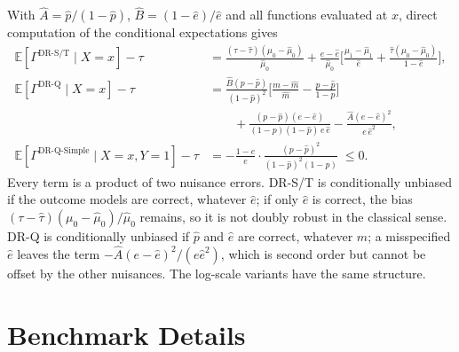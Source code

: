 \documentclass{article}
\newcommand{\E}{\mathbb{E}}
\begin{document}
With $\hat A=\hat p/(1-\hat p)$, $\hat B=(1-\hat e)/\hat e$ and all
functions evaluated at $x$, direct computation of the conditional
expectations gives
\begin{align}
\E[\Gamma^{\text{DR-S/T}}\mid X{=}x]-\tau
 &=\frac{(\tau-\hat\tau)(\mu_0-\hat\mu_0)}{\hat\mu_0}
  +\frac{e-\hat e}{\hat\mu_0}\Big[\frac{\mu_1-\hat\mu_1}{\hat e}+\frac{\hat\tau(\mu_0-\hat\mu_0)}{1-\hat e}\Big],\\
\E[\Gamma^{\text{DR-Q}}\mid X{=}x]-\tau
 &=\frac{\hat B(p-\hat p)}{(1-\hat p)^2}\Big[\frac{m-\hat m}{\hat m}-\frac{p-\hat p}{1-p}\Big]
  \nonumber\\
 &\qquad+\frac{(p-\hat p)(e-\hat e)}{(1-p)(1-\hat p)\,e\,\hat e}
  -\frac{\hat A(e-\hat e)^2}{e\,\hat e^2},\\
\E[\Gamma^{\text{DR-Q-Simple}}\mid X{=}x,Y{=}1]-\tau
 &=-\frac{1-e}{e}\cdot\frac{(p-\hat p)^2}{(1-\hat p)^2(1-p)}\;\le 0 .
\end{align}
Every term is a product of two nuisance errors. DR-S/T is conditionally
unbiased if the outcome models are correct, whatever $\hat e$; if only
$\hat e$ is correct, the bias $(\tau-\hat\tau)(\mu_0-\hat\mu_0)/\hat\mu_0$
remains, so it is not doubly robust in the classical sense. DR-Q is
conditionally unbiased if $\hat p$ and $\hat e$ are correct, whatever
$\hat m$; a misspecified $\hat e$ leaves the term
$-\hat A(e-\hat e)^2/(e\hat e^2)$, which is second order but cannot be
offset by the other nuisances. The log-scale variants have the same
structure.

\section{Benchmark Details}
\label{app:details}
\end{document}

